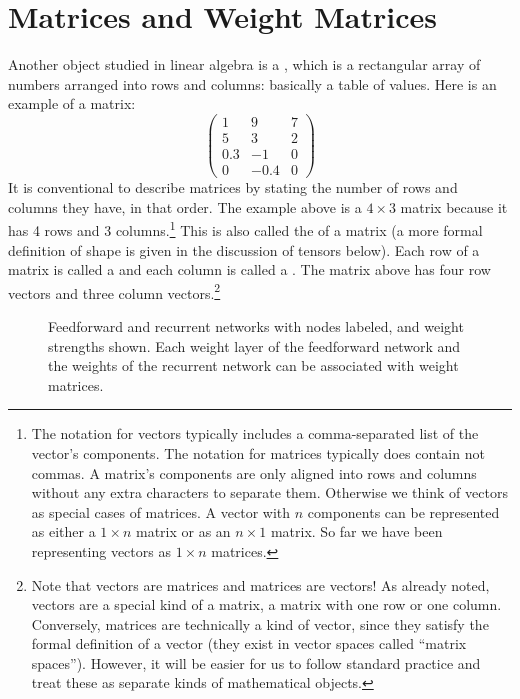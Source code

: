 
\section{Matrices and Weight Matrices}\label{weightMatrices}

   Another object studied in linear algebra is a , which is a 
rectangular array of numbers arranged into rows and columns: basically a table of 
values. Here is an example of a matrix:
\[
\begin{pmatrix}
 1  &   9  & 7 \\
 5  &   3  & 2 \\
0.3 &  -1  & 0 \\
 0  & -0.4 & 0
\end{pmatrix}
\]
It is conventional to describe matrices by stating the number of rows and 
columns they have, in that order. The example above is a $4 \times 3$ 
matrix because it has 4 rows and 3 columns.\footnote{The notation for vectors typically includes a comma-separated list of the vector's components. The notation for matrices typically does contain not commas. A  matrix's components are only aligned into rows and columns without any extra characters to separate them. Otherwise we think of vectors as special cases of matrices. A vector with $n$ components can be represented as either a $1 \times n$ matrix or as an $n \times 1$ matrix. So far we have been representing vectors as $1 \times n$ matrices.} This is also called the  of a matrix (a more formal definition of shape is given in the discussion of tensors below). Each row of a matrix is called a  and each column is called a . The matrix above has four row vectors and 
three column vectors.\footnote{Note that vectors  are matrices and matrices are vectors!  As already noted, vectors are a special kind of a matrix, 
a matrix with one row or one column. Conversely, matrices are technically a 
kind of vector, since they satisfy the formal definition of a vector (they 
exist in vector spaces called ``matrix spaces''). However, it will be easier for us to follow standard practice and treat these as separate kinds of mathematical objects.}  

\begin{figure}[h]
\centering
{}
\hspace*{.7in}
\caption[Simbrain screenshots modified by Jeff Yoshimi.]{Feedforward and recurrent networks with nodes labeled, and weight strengths shown. Each weight layer of the feedforward network and the weights of the recurrent network can be associated with weight matrices. }
\label{labelledNets}
\end{figure}

